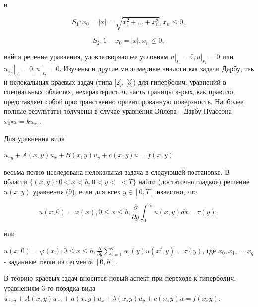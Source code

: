 \documentclass[10pt]{article}
\begin{document}
и



\[

S_{1}: x_{0}=|x|=\sqrt{x_{1}^{2}+\ldots+x_{n}^{2}}, x_{n} \leqslant 0,

\]



\[

S_{2}: 1-x_{0}=|x|, x_{n} \leqslant 0,

\]



найти репение уравнения, удовлетворяюшее условиям $\left.u\right|_{s_{0}}=0,\left.u\right|_{s_{2}}=0$ или $\left.u_{x_{n}}\right|_{s_{0}}=0,\left.u\right|_{s_{2}}=0$. Изучены и другие многомерные аналоги как задачи Дарбу, так и нелокальных краевых задач (типа [2], [3]) для гиперболич. уравнений в специальных областях, нехарактеристич. часть границы к-рых, как правило, представляет собой пространственно ориентированную поверхность. Наиболее полные результаты получены в случае уравнения Эйлера - Дарбу Пуассона $x_{0} \square u=k u_{x_{0}}$.



Для уравнения вида



$u_{x y}+A(x, y) u_{x}+B(x, y) u_{y}+c(x, y) u=f(x, y)$



весьма полно исследована нелокальная задача в следуюшей постановке. В области $\{(x, y): 0<x<h, 0<y<$ $<T\}$ найти (достаточно гладкое) решение $u(x, y)$ уравнения (9), если для всех $y \in[0, T]$ известно, что



\[

u(x, 0)=\varphi(x), 0 \leqslant x \leqslant h, \frac{\partial}{\partial y} \int_{0}^{x_{0}} u(x, y) d x=\tau(y),

\]



или



$u(x, 0)=\varphi(x), 0 \leqslant x \leqslant h, \frac{\partial}{\partial y} \sum_{i=1}^{q} \alpha_{j}(y) u\left(x^{j}, y\right)=\tau(y)$, где $x_{0}, x_{1}, \ldots, x_{q}$ - заданные точки из сегмента $[0, h]$.



В теорию краевых задач вносится новый аспект при переходе к гиперболич. уравнениям 3-го порядка вида $u_{x x y}+A(x, y) u_{x x}+a(x, y) u_{x}+b(x, y) u_{y}+c(x, y) u=f(x, y)$,
\end{document}
